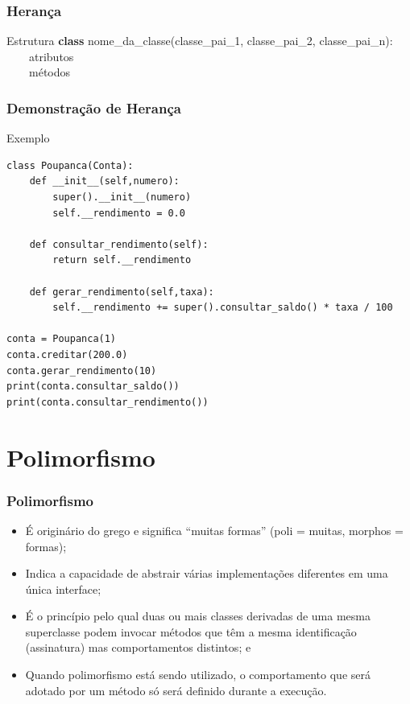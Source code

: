 \documentclass{beamer}
\begin{document}
\begin{frame}
	\frametitle{Herança}
	
	\begin{block}{Estrutura}
	\textbf{class}
	nome\_da\_classe(classe\_pai\_1, classe\_pai\_2, classe\_pai\_n):\\
	~~~~atributos\\
	~~~~métodos
	\end{block}\vfill	
\end{frame}

\begin{frame}[fragile]
	\frametitle{Demonstração de Herança}
		
	\begin{exampleblock}{Exemplo}
		\begin{lstlisting}
class Poupanca(Conta):
    def __init__(self,numero):
        super().__init__(numero)
        self.__rendimento = 0.0
    
    def consultar_rendimento(self):
        return self.__rendimento

    def gerar_rendimento(self,taxa):
        self.__rendimento += super().consultar_saldo() * taxa / 100

conta = Poupanca(1)
conta.creditar(200.0)
conta.gerar_rendimento(10)
print(conta.consultar_saldo())
print(conta.consultar_rendimento())        
       \end{lstlisting}
	\end{exampleblock}
\end{frame}

\section{Polimorfismo}

\begin{frame}
	\frametitle{Polimorfismo}
	
	\begin{itemize}
	  \item É originário do grego e significa ``muitas formas'' (poli = muitas,
	  morphos = formas);
	  \item Indica a capacidade de abstrair várias implementações diferentes em uma
	  única interface;
	  \item É o princípio pelo qual duas ou mais classes derivadas de uma mesma
	  superclasse podem invocar métodos que têm a mesma identificação (assinatura)
	  mas comportamentos distintos; e
	  \item Quando polimorfismo está sendo utilizado, o comportamento que será
	  adotado por um método só será definido durante a execução.
	\end{itemize}
\end{frame}
\end{document}
